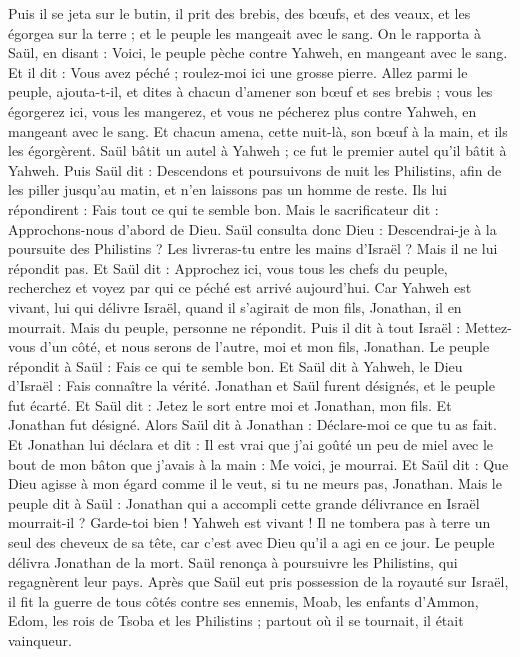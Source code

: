 \begin{multicols}{2}
Puis il se jeta sur le butin, il prit des brebis, des bœufs, et des veaux, et les égorgea sur la terre ; et le peuple les mangeait avec le sang.
On le rapporta à Saül, en disant : Voici, le peuple pèche contre Yahweh, en mangeant avec le sang. Et il dit : Vous avez péché ; roulez-moi ici une grosse pierre.
Allez parmi le peuple, ajouta-t-il, et dites à chacun d’amener son bœuf et ses brebis ; vous les égorgerez ici, vous les mangerez, et vous ne pécherez plus contre Yahweh, en mangeant avec le sang. Et chacun amena, cette nuit-là, son bœuf à la main, et ils les égorgèrent.
Saül bâtit un autel à Yahweh ; ce fut le premier autel qu'il bâtit à Yahweh.
Puis Saül dit : Descendons et poursuivons de nuit les Philistins, afin de les piller jusqu'au matin, et n’en laissons pas un homme de reste. Ils lui répondirent : Fais tout ce qui te semble bon. Mais le sacrificateur dit : Approchons-nous d’abord de Dieu.
Saül consulta donc Dieu : Descendrai-je à la poursuite des Philistins ? Les livreras-tu entre les mains d'Israël ? Mais il ne lui répondit pas.
Et Saül dit : Approchez ici, vous tous les chefs du peuple, recherchez et voyez par qui ce péché est arrivé aujourd'hui.
Car Yahweh est vivant, lui qui délivre Israël, quand il s’agirait de mon fils, Jonathan, il en mourrait. Mais du peuple, personne ne répondit.
Puis il dit à tout Israël : Mettez-vous d'un côté, et nous serons de l'autre, moi et mon fils, Jonathan. Le peuple répondit à Saül : Fais ce qui te semble bon.
Et Saül dit à Yahweh, le Dieu d'Israël : Fais connaître la vérité. Jonathan et Saül furent désignés, et le peuple fut écarté.
Et Saül dit : Jetez le sort entre moi et Jonathan, mon fils. Et Jonathan fut désigné.
Alors Saül dit à Jonathan : Déclare-moi ce que tu as fait. Et Jonathan lui déclara et dit : Il est vrai que j'ai goûté un peu de miel avec le bout de mon bâton que j'avais à la main : Me voici, je mourrai.
Et Saül dit : Que Dieu agisse à mon égard comme il le veut, si tu ne meurs pas, Jonathan.
Mais le peuple dit à Saül : Jonathan qui a accompli cette grande délivrance en Israël mourrait-il ? Garde-toi bien ! Yahweh est vivant ! Il ne tombera pas à terre un seul des cheveux de sa tête, car c’est avec Dieu qu’il a agi en ce jour. Le peuple délivra Jonathan de la mort.
Saül renonça à poursuivre les Philistins, qui regagnèrent leur pays.
Après que Saül eut pris possession de la royauté sur Israël, il fit la guerre de tous côtés contre ses ennemis, Moab, les enfants d’Ammon, Edom, les rois de Tsoba et les Philistins ; partout où il se tournait, il était vainqueur.

\end{multicols}
